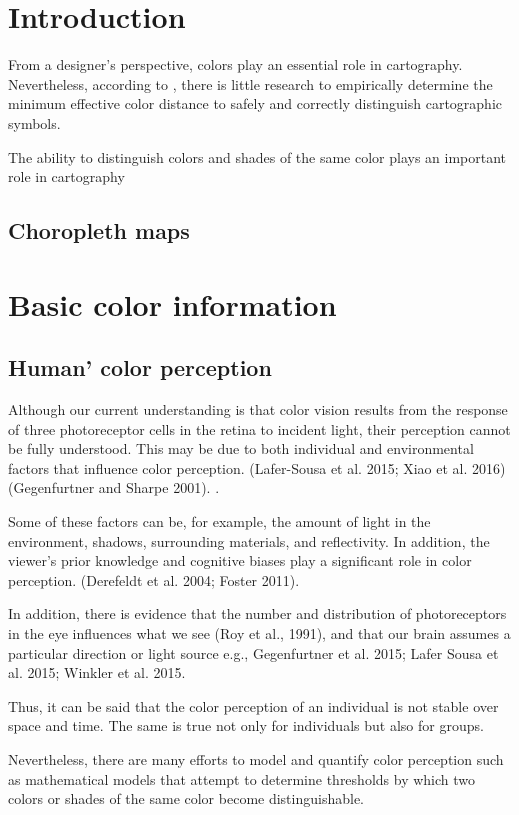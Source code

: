 \section{Introduction}
From a designer's perspective, colors play an essential role in cartography. Nevertheless, according to \textcite{brychtova2017}, there is little research to empirically determine the minimum effective color distance to safely and correctly distinguish cartographic symbols. 

The ability to distinguish colors and shades of the same color plays an important role in cartography \parencite{coltekin2017}

\subsection{Choropleth maps}

\section{Basic color information}

\subsection{Human' color perception}
Although our current understanding is that color vision results from the response of three photoreceptor cells in the retina to incident light, their perception cannot be fully understood. This may be due to both individual and environmental factors that influence color perception. (Lafer-Sousa et al. 2015; Xiao et al. 2016) (Gegenfurtner and Sharpe 2001). .

Some of these factors can be, for example, the amount of light in the environment, shadows, surrounding materials, and reflectivity. In addition, the viewer's prior knowledge and cognitive biases play a significant role in color perception. (Derefeldt et al. 2004; Foster 2011). 

In addition, there is evidence that the number and distribution of photoreceptors in the eye influences what we see (Roy et al., 1991), and that our brain assumes a particular direction or light source e.g., Gegenfurtner et al. 2015; Lafer Sousa et al. 2015; Winkler et al. 2015. 

Thus, it can be said that the color perception of an individual is not stable over space and time. The same is true not only for individuals but also for groups.  

Nevertheless, there are many efforts to model and quantify color perception such as mathematical models that attempt to determine thresholds by which two colors or shades of the same color become distinguishable. 

